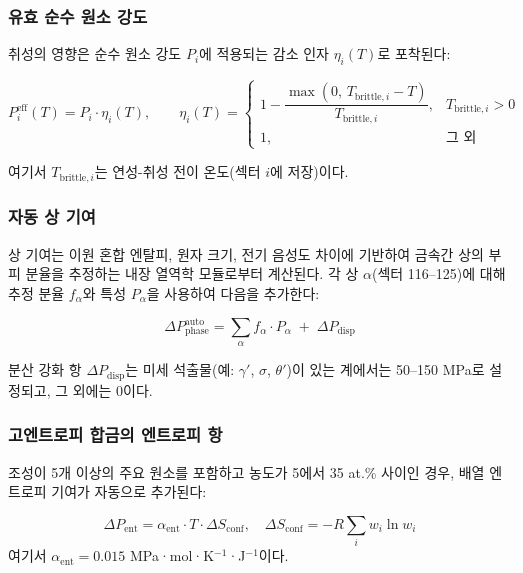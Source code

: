 \documentclass[12pt,a4paper]{article}
\begin{document}
	\subsubsection{유효 순수 원소 강도}
	취성의 영향은 순수 원소 강도 \(P_i\)에 적용되는 감소 인자 \(\eta_i(T)\)로 포착된다:
	
	\begin{equation}
		P_i^{\text{eff}}(T) = P_i \cdot \eta_i(T), \qquad
		\eta_i(T) = 
		\begin{cases}
			1 - \dfrac{\max(0,\, T_{\text{brittle},i} - T)}{T_{\text{brittle},i}}, & T_{\text{brittle},i} > 0 \\
			1, & \text{그 외}
		\end{cases}
	\end{equation}
	
	여기서 \(T_{\text{brittle},i}\)는 연성-취성 전이 온도(섹터 \(i\)에 저장)이다.
	
	\subsubsection{자동 상 기여}
	상 기여는 이원 혼합 엔탈피, 원자 크기, 전기 음성도 차이에 기반하여 금속간 상의 부피 분율을 추정하는 내장 열역학 모듈로부터 계산된다. 각 상 \(\alpha\)(섹터 116–125)에 대해 추정 분율 \(f_{\alpha}\)와 특성 \(P_{\alpha}\)을 사용하여 다음을 추가한다:
	
	\begin{equation}
		\Delta P_{\text{phase}}^{\text{auto}} = \sum_{\alpha} f_{\alpha} \cdot P_{\alpha} \;+\; \Delta P_{\text{disp}}
	\end{equation}
	
	분산 강화 항 \(\Delta P_{\text{disp}}\)는 미세 석출물(예: \(\gamma'\), \(\sigma\), \(\theta'\))이 있는 계에서는 50–150 MPa로 설정되고, 그 외에는 0이다.
	
	\subsubsection{고엔트로피 합금의 엔트로피 항}
	조성이 5개 이상의 주요 원소를 포함하고 농도가 5에서 35 at.\% 사이인 경우, 배열 엔트로피 기여가 자동으로 추가된다:
	
	\begin{equation}
		\Delta P_{\text{ent}} = \alpha_{\text{ent}} \cdot T \cdot \Delta S_{\text{conf}}, \quad
		\Delta S_{\text{conf}} = -R \sum_i w_i \ln w_i
	\end{equation}
	여기서 \(\alpha_{\text{ent}} = 0.015\) MPa·mol·K\(^{-1}\)·J\(^{-1}\)이다.
	
\end{document}
